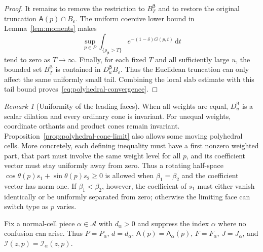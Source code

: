 \documentclass[11pt]{amsart}
\numberwithin{equation}{section}
\theoremstyle{definition}
\theoremstyle{remark}
\newtheorem{remark}[theorem]{Remark}
\newcommand{\dd}{\,\mathrm{d}}
\newcommand{\eps}{\varepsilon}
\newcommand{\cA}{\mathcal{A}}
\newcommand{\cI}{\mathcal{I}}
\newcommand{\Afib}{\mathsf{A}}
\begin{document}
\begin{proof}
It remains to remove the restriction to $B_T^{\bm\beta}$ and to restore the
original truncation $\Afib(p)\cap B_\eps$.  The uniform coercive lower bound in
Lemma~\ref{lem:moments} makes
\[
 \sup_{p\in P}\int_{\{\rho_{\bm\beta}>T\}}
 e^{-(1-\delta)G(p,t)}\dd t
\]
tend to zero as $T\to\infty$.  Finally, for each fixed $T$ and all sufficiently
large $u$, the bounded set $B_T^{\bm\beta}$ is contained in
$D_u^{\bm\beta}B_\eps$.  Thus the Euclidean truncation can only affect the
same uniformly small tail.  Combining the local slab estimate with this tail
bound proves~\eqref{eq:polyhedral-convergence}.
\end{proof}

\begin{remark}[Uniformity of the leading faces]
When all weights are equal, $D_u^{\bm\beta}$ is a scalar dilation and every
ordinary cone is invariant.  For unequal weights, coordinate orthants and
product cones remain invariant.  Proposition~\ref{prop:polyhedral-cone-limit}
also allows some moving polyhedral cells.  More concretely, each defining
inequality must have a first nonzero weighted part, that part must involve the
same weight level for all $p$, and its coefficient vector must stay uniformly
away from zero.  Thus a rotating half-space
$\cos\theta(p)s_1+\sin\theta(p)s_2\ge0$ is allowed when
$\beta_1=\beta_2$ and the coefficient vector has norm one.  If
$\beta_1<\beta_2$, however, the coefficient of $s_1$ must either vanish
identically or be uniformly separated from zero; otherwise the limiting face
can switch type as $p$ varies.
\end{remark}

Fix a normal-cell piece $\alpha\in\cA$ with $d_\alpha>0$ and suppress
the index $\alpha$ where no confusion can arise.  Thus $P=P_\alpha$, $d=d_\alpha$, $\Afib(p)=\Afib_\alpha(p)$,
$F=F_\alpha$, $J=J_\alpha$, and $\cI(z,p)=\cI_\alpha(z,p)$.
\end{document}
